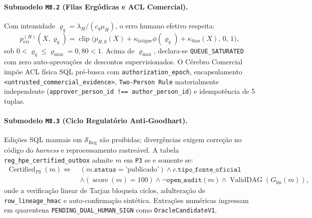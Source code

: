 \documentclass[10pt,twocolumn]{article}
\begin{document}
\paragraph{Submodelo \texttt{M8.2} (Filas Erg\'odicas e ACL Comercial).}
Com intensidade $\varrho_q = \lambda_H/(c_q\mu_H)$, o erro humano efetivo respeita:
\begin{equation}
p_{\mathrm{err}}^{(H)}(X,\varrho_q) = \operatorname{clip}\!\bigl(p_{H,0}(X) + \kappa_{\mathrm{fatigue}}\phi(\varrho_q) + \kappa_{\mathrm{bias}}(X),\, 0,\, 1\bigr),
\end{equation}
sob $0 < \varrho_q \le \varrho_{\max} = 0,80 < 1$. Acima de $\varrho_{\max}$, declara-se \texttt{QUEUE\_SATURATED} com zero auto-aprova\c{c}\~oes de descontos supervisionados. O C\'erebro Comercial imp\~oe ACL f\'isica SQL pr\'e-busca com \texttt{authorization\_epoch}, encapsulamento \texttt{<untrusted\_commercial\_evidence>}, \texttt{Two-Person Rule} materialmente independente (\texttt{approver\_person\_id !== author\_person\_id}) e idempot\^encia de 5 tuplas.

\paragraph{Submodelo \texttt{M8.3} (Ciclo Regulat\'orio Anti-Goodhart).}
Edi\c{c}\~oes SQL manuais em $\mathcal{S}_{\mathrm{Reg}}$ s\~ao proibidas; diverg\^encias exigem corre\c{c}\~ao no c\'odigo do \emph{harness} e reprocessamento rastre\'avel. A tabela \texttt{reg\_hpe\_certified\_outbox} admite $m$ em \texttt{P3} se e somente se:
\begin{equation}
\begin{aligned}
\operatorname{Certified}_{P3}(m) \iff\;& (m.\texttt{status}=\text{'publicado'}) \land c.\texttt{tipo\_fonte\_oficial} \\
&\land (\operatorname{score}(m)=100) \land \neg\texttt{open\_audit}(m) \land \operatorname{ValidDAG}(G_{\mathrm{lin}}(m)),
\end{aligned}
\end{equation}
onde a verifica\c{c}\~ao linear de Tarjan \cite{tarjan1972depth} bloqueia ciclos, adultera\c{c}\~ao de \texttt{row\_lineage\_hmac} e auto-confirma\c{c}\~ao sint\'etica. Extra\c{c}\~oes num\'ericas ingressam em quarentena \texttt{PENDING\_DUAL\_HUMAN\_SIGN} como \texttt{OracleCandidateV1}.
\end{document}
